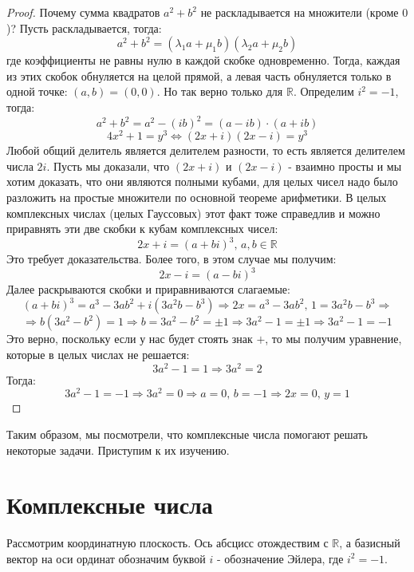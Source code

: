 \documentclass[12pt]{article}
\newcommand{\MR}{\mathbb{R}}
\theoremstyle{definition}
\begin{document}
\begin{proof}
	Почему сумма квадратов $a^2 + b^2$ не раскладывается на множители (кроме $0$)? Пусть раскладывается, тогда:
	$$
		a^2 + b^2 =(\lambda_1 a + \mu_1 b)(\lambda_2 a + \mu_2 b)
	$$
	где коэффициенты не равны нулю в каждой скобке одновременно. Тогда, каждая из этих скобок обнуляется на целой прямой, а левая часть обнуляется только в одной точке: $(a,b) = (0,0)$. Но так верно только для $\MR$. Определим $i^2 = -1$, тогда:
	$$
		a^2 + b^2 = a^2 - (ib)^2 = (a -ib){\cdot}(a + ib)
	$$
	$$
		4x^2 + 1 = y^3 \Leftrightarrow (2x + i)(2x -i) = y^3
	$$
	Любой общий делитель является делителем разности, то есть является делителем числа $2i$. Пусть мы доказали, что $(2x + i)$ и $(2x - i)$ - взаимно просты и мы хотим доказать, что они являются полными кубами, для целых чисел надо было разложить на простые множители по основной теореме арифметики. В целых комплексных числах (целых Гауссовых) этот факт тоже справедлив и можно приравнять эти две скобки к кубам комплексных чисел:
	$$
		2x + i = (a + bi)^3, \, a,b \in \MR 
	$$
	Это требует доказательства. Более того, в этом случае мы получим:
	$$
		2x - i = (a - bi)^3
	$$
	Далее раскрываются скобки и приравниваются слагаемые:
	$$
		(a + bi)^3 = a^3 - 3ab^2 + i(3a^2b - b^3) \Rightarrow 2x = a^3 - 3ab^2, \, 1 = 3a^2b - b^3 \Rightarrow 
	$$
	$$
		\Rightarrow b(3a^2 -b^2) = 1 \Rightarrow b = 3a^2 - b^2 = \pm 1  \Rightarrow 3a^2 - 1 = \pm 1 \Rightarrow 3a^2 -1 = -1
	$$
	Это верно, поскольку если у нас будет стоять знак $+$, то мы получим уравнение, которые в целых числах не решается:
	$$
		3a^2 - 1 = 1 \Rightarrow 3a^2 = 2
	$$
	Тогда:
	$$
		3a^2 -1 = -1 \Rightarrow 3a^2 = 0 \Rightarrow a = 0, \, b = -1 \Rightarrow 2x = 0, \, y = 1 
	$$
\end{proof}
Таким образом, мы посмотрели, что комплексные числа помогают решать некоторые задачи. Приступим к их изучению.

\newpage

\section*{Комплексные числа}

Рассмотрим координатную плоскость. Ось абсцисс отождествим с $\MR$, а базисный вектор на оси ординат обозначим буквой $i$ - обозначение Эйлера, где $i^2 = -1$.
\end{document}
